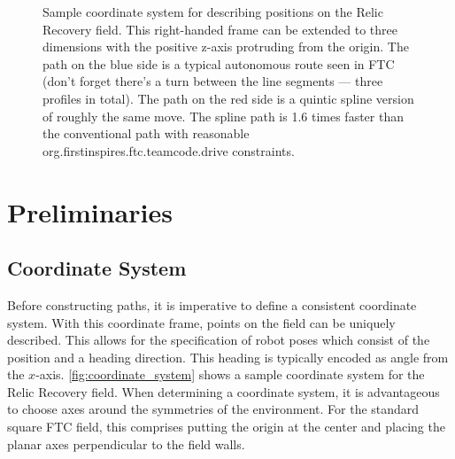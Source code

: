 \documentclass{article}
\begin{document}
\begin{figure}
    \centering

    
    \caption{Sample coordinate system for describing positions on the Relic Recovery field. This right-handed frame can be extended to three dimensions with the positive z-axis protruding from the origin. The path on the blue side is a typical autonomous route seen in FTC (don't forget there's a turn between the line segments --- three profiles in total). The path on the red side is a quintic spline version of roughly the same move. The spline path is 1.6 times faster than the conventional path with reasonable org.firstinspires.ftc.teamcode.drive constraints.}
    \label{fig:coordinate_system}
\end{figure}

\section{Preliminaries}

\subsection{Coordinate System}
Before constructing paths, it is imperative to define a consistent coordinate system. With this coordinate frame, points on the field can be uniquely described. This allows for the specification of robot poses which consist of the position and a heading direction. This heading is typically encoded as angle from the $x$-axis. \autoref{fig:coordinate_system} shows a sample coordinate system for the Relic Recovery field. When determining a coordinate system, it is advantageous to choose axes around the symmetries of the environment. For the standard square FTC field, this comprises putting the origin at the center and placing the planar axes perpendicular to the field walls.
\end{document}
